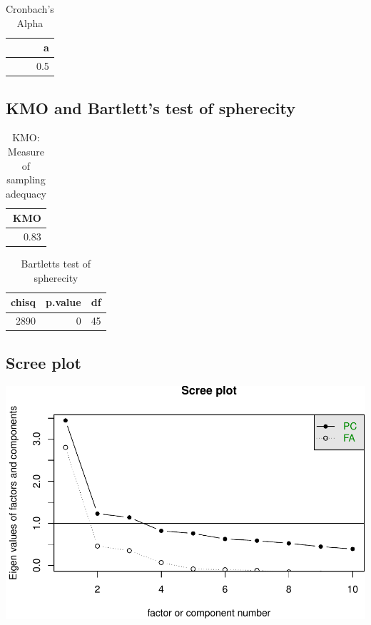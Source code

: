 \documentclass[]{article}
\begin{document}
\begin{table}[H]

\caption{\label{tab:unnamed-chunk-48}Cronbach's Alpha}
\centering
\fontsize{6}{8}\selectfont
\begin{tabular}[t]{r}
\toprule
a\\
\midrule
0.5\\
\bottomrule
\end{tabular}
\end{table}

\hypertarget{kmo-and-bartletts-test-of-spherecity-9}{%
\subsection{KMO and Bartlett's test of
spherecity}\label{kmo-and-bartletts-test-of-spherecity-9}}

\begin{table}[H]

\caption{\label{tab:unnamed-chunk-49}KMO: Measure of sampling adequacy}
\centering
\fontsize{6}{8}\selectfont
\begin{tabular}[t]{r}
\toprule
KMO\\
\midrule
0.83\\
\bottomrule
\end{tabular}
\end{table}

\begin{table}[H]

\caption{\label{tab:unnamed-chunk-49}Bartletts test of spherecity}
\centering
\fontsize{6}{8}\selectfont
\begin{tabular}[t]{rrr}
\toprule
chisq & p.value & df\\
\midrule
2890 & 0 & 45\\
\bottomrule
\end{tabular}
\end{table}

\hypertarget{scree-plot-9}{%
\subsection{Scree plot}\label{scree-plot-9}}

\includegraphics{PCA_covid_files/figure-latex/unnamed-chunk-50-1.pdf}
\end{document}
